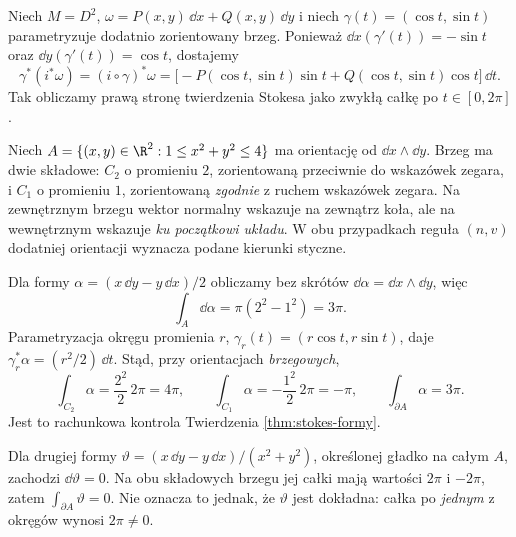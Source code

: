 \begin{przyklad}
Niech $M=D^2$, $\omega=P(x,y)\,\dd x+Q(x,y)\,\dd y$
i niech $\gamma(t)=(\cos t,\sin t)$ parametryzuje
dodatnio zorientowany brzeg. Ponieważ
$\dd x(\gamma'(t))=-\sin t$ oraz
$\dd y(\gamma'(t))=\cos t$, dostajemy
\[
 \gamma^*(i^*\omega)
 =(i\circ\gamma)^*\omega
 =\bigl[-P(\cos t,\sin t)\sin t
       +Q(\cos t,\sin t)\cos t\bigr]\,\dd t.
\]
Tak obliczamy prawą stronę twierdzenia Stokesa
jako zwykłą całkę po $t\in[0,2\pi]$.
\end{przyklad}

\begin{przyklad}
\label{prz:stokes-pierscien-dwa-brzegi}
Niech $A=\{(x,y)\in\R^2:1\le x^2+y^2\le4\}$
ma orientację od $\dd x\wedge\dd y$.
Brzeg ma dwie składowe:
$C_2$ o promieniu $2$, zorientowaną
przeciwnie do wskazówek zegara, i $C_1$
o promieniu $1$, zorientowaną \emph{zgodnie}
z ruchem wskazówek zegara.
Na zewnętrznym brzegu wektor normalny wskazuje
na zewnątrz koła, ale na wewnętrznym wskazuje
\emph{ku początkowi układu}. W obu przypadkach
reguła $(n,v)$ dodatniej orientacji wyznacza
podane kierunki styczne.

Dla formy
$\alpha=(x\,\dd y-y\,\dd x)/2$
obliczamy bez skrótów
$\dd\alpha=\dd x\wedge\dd y$, więc
\[
 \int_A\dd\alpha
 =\pi(2^2-1^2)=3\pi.
\]
Parametryzacja okręgu promienia $r$,
$\gamma_r(t)=(r\cos t,r\sin t)$,
daje
$\gamma_r^*\alpha=(r^2/2)\,\dd t$.
Stąd, przy orientacjach \emph{brzegowych},
\[
 \int_{C_2}\alpha=\frac{2^2}{2}\,2\pi=4\pi,
 \qquad
 \int_{C_1}\alpha=-\frac{1^2}{2}\,2\pi=-\pi,
 \qquad
 \int_{\partial A}\alpha=3\pi.
\]
Jest to rachunkowa kontrola Twierdzenia
\ref{thm:stokes-formy}.

Dla drugiej formy
$\vartheta=(x\,\dd y-y\,\dd x)/(x^2+y^2)$,
określonej gładko na całym $A$,
zachodzi $\dd\vartheta=0$.
Na obu składowych brzegu jej całki mają
wartości $2\pi$ i $-2\pi$, zatem
$\int_{\partial A}\vartheta=0$.
Nie oznacza to jednak, że $\vartheta$ jest
dokładna: całka po \emph{jednym} z okręgów
wynosi $2\pi\ne0$.
\end{przyklad}

